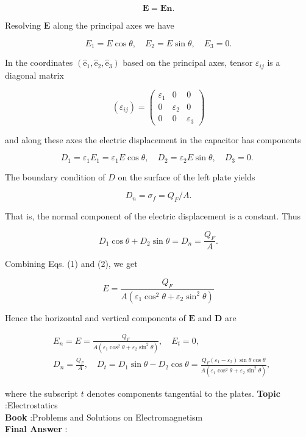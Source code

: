 \documentclass[10pt]{article}
\begin{document}
$$
\mathbf{E}=\boldsymbol{E n} .
$$

Resolving $\mathbf{E}$ along the principal axes we have

$$
E_{1}=E \cos \theta, \quad E_{2}=E \sin \theta, \quad E_{3}=0 .
$$

In the coordinates $\left(\hat{\mathrm{e}}_{1}, \hat{\mathrm{e}}_{2}, \hat{\mathrm{e}}_{3}\right)$ based on the principal axes, tensor $\varepsilon_{i j}$ is a diagonal matrix

$$
\left(\varepsilon_{i j}\right)=\left(\begin{array}{ccc}
\varepsilon_{1} & 0 & 0 \\
0 & \varepsilon_{2} & 0 \\
0 & 0 & \varepsilon_{3}
\end{array}\right)
$$

and along these axes the electric displacement in the capacitor has components

$$
D_{1}=\varepsilon_{1} E_{1}=\varepsilon_{1} E \cos \theta, \quad D_{2}=\varepsilon_{2} E \sin \theta, \quad D_{3}=0 \text {. }
$$

The boundary condition of $D$ on the surface of the left plate yields

$$
D_{n}=\sigma_{f}=Q_{F} / A .
$$

That is, the normal component of the electric displacement is a constant. Thus

$$
D_{1} \cos \theta+D_{2} \sin \theta=D_{n}=\frac{Q_{F}}{A} .
$$

Combining Eqs.
(1) and (2), we get

$$
E=\frac{Q_{F}}{A\left(\varepsilon_{1} \cos ^{2} \theta+\varepsilon_{2} \sin ^{2} \theta\right)}
$$

Hence the horizontal and vertical components of $\mathbf{E}$ and $\mathbf{D}$ are

$$
\begin{aligned}
&E_{n}=E=\frac{Q_{F}}{A\left(\varepsilon_{1} \cos ^{2} \theta+\varepsilon_{2} \sin ^{2} \theta\right)}, \quad E_{t}=0, \\
&D_{n}=\frac{Q_{F}}{A}, \quad D_{t}=D_{1} \sin \theta-D_{2} \cos \theta=\frac{Q_{F}\left(\varepsilon_{1}-\varepsilon_{2}\right) \sin \theta \cos \theta}{A\left(\varepsilon_{1} \cos ^{2} \theta+\varepsilon_{2} \sin ^{2} \theta\right)},
\end{aligned}
$$

where the subscript $t$ denotes components tangential to the plates.
\textbf{Topic} :Electrostatics\\
\textbf{Book} :Problems and Solutions on Electromagnetism\\
\textbf{Final Answer} :\\
\end{document}
